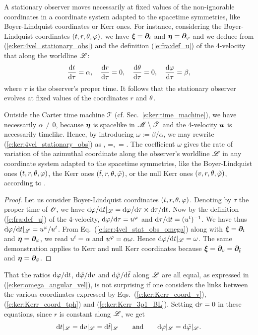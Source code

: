 A stationary observer moves necessarily at fixed values of the non-ignorable coordinates
in a coordinate system adapted to the spacetime symmetries, like Boyer-Lindquist coordinates or Kerr
ones. For instance, considering the Boyer-Lindquist coordinates $(t, r, \theta, \varphi)$,
we have $\bm{\xi} = \bm{\partial}_t$ and $\bm{\eta} = \bm{\partial}_\varphi$ and
we deduce from (\ref{e:ker:4vel_stationary_obs}) and the definition (\ref{e:fra:def_u}) of the
4-velocity that along the worldline $\mathscr{L}$:
\[
    \frac{\mathrm{d} t}{\mathrm{d}\tau} = \alpha,\quad
    \frac{\mathrm{d} r}{\mathrm{d}\tau} = 0,\quad
    \frac{\mathrm{d} \theta}{\mathrm{d}\tau} = 0,\quad
    \frac{\mathrm{d} \varphi}{\mathrm{d}\tau} = \beta,
\]
where $\tau$ is the observer's proper time. It follows that
the stationary observer evolves at fixed values of the coordinates $r$ and $\theta$.

Outside the Carter time machine $\mathscr{T}$ (cf. Sec.~\ref{s:ker:time_machine}), we have
necessarily $\alpha\neq 0$, because $\bm{\eta}$ is spacelike in $\mathscr{M}\setminus\mathscr{T}$
and the 4-velocity $\bm{u}$ is necessarily timelike. Hence,
by introducing $\omega := \beta/\alpha$, we may rewrite
(\ref{e:ker:4vel_stationary_obs}) as
\be \label{e:ker:4vel_stat_obs_omega}
    , \qquad \alpha=,\ \omega= .
\ee
The coefficient $\omega$ gives the rate of variation of the azimuthal coordinate along the observer's worldline $\mathscr{L}$
in any coordinate system adapted to the spacetime symmetries, like the Boyer-Lindquist ones
$(t,r,\theta,\varphi)$, the Kerr ones $({\tilde t}, r, \theta, {\tilde\varphi})$, or the null Kerr ones $(v,r,\theta,{\tilde\varphi})$,
according to
\be \label{e:ker:omega_angular_vel}
     .
\ee
\begin{proof}
Let us consider Boyer-Lindquist coordinates $(t,r,\theta,\varphi)$. Denoting by $\tau$
the proper time of $\mathscr{O}$, we have
$\mathrm{d}\varphi/\mathrm{d} t |_{\mathscr{L}}= {\mathrm{d} \varphi}/{\mathrm{d} \tau} \times {\mathrm{d}\tau}/{\mathrm{d} t}$. Now by the
definition (\ref{e:fra:def_u}) of the 4-velocity, ${\mathrm{d} \varphi}/{\mathrm{d} \tau} = u^\varphi$
and ${\mathrm{d} \tau}/{\mathrm{d} t} = (u^t)^{-1}$. We have thus $\mathrm{d}\varphi/\mathrm{d} t |_{\mathscr{L}}= u^\varphi/u^t$.
From Eq.~(\ref{e:ker:4vel_stat_obs_omega}) along with
$\bm{\xi} = \bm{\partial}_t$ and $\bm{\eta} = \bm{\partial}_\varphi$, we read $u^t = \alpha$
and $u^\varphi = \alpha\omega$. Hence $\mathrm{d}\varphi/\mathrm{d} t |_{\mathscr{L}}=\omega$.
The same demonstration applies to Kerr and null Kerr coordinates because
$\bm{\xi} = \bm{\partial}_v = \bm{\partial}_{{\tilde t}}$ and $\bm{\eta} = \bm{\partial}_{{\tilde\varphi}}$.
\end{proof}
\begin{remark}
That the ratios $\mathrm{d}\varphi/\mathrm{d} t$, $\mathrm{d}{\tilde\varphi}/\mathrm{d} v$ and $\mathrm{d}{\tilde\varphi}/\mathrm{d} {\tilde t}$ along $\mathscr{L}$
are all equal, as expressed in (\ref{e:ker:omega_angular_vel}), is not
surprising if one considers the links between the various coordinates
expressed by Eqs.~(\ref{e:ker:Kerr_coord_v}), (\ref{e:ker:Kerr_coord_tph}) and (\ref{e:ker:Kerr_3p1_BL}).
Setting $\mathrm{d} r = 0$ in these equations, since $r$ is constant along $\mathscr{L}$, we get
\[
    \mathrm{d} t |_{\mathscr{L}} = \mathrm{d} v |_{\mathscr{L}} = \mathrm{d}{\tilde t} |_{\mathscr{L}} \qquad\mbox{and}\qquad
    \mathrm{d} \varphi |_{\mathscr{L}} = \mathrm{d} {\tilde\varphi} | _{\mathscr{L}} .
\]
\end{remark}

